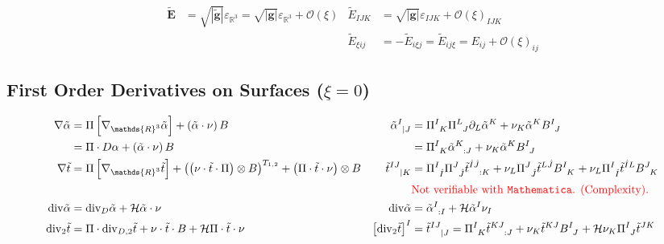 \documentclass[a4paper,7pt]{scrartcl}
\newcommand{\R}{\mathds{R}}
\newcommand{\mean}{\mathcal{H}}
\renewcommand{\div}{\mathrm{div}}
\newcommand{\gb}{\mathbf{g}}
\newcommand{\Eb}{\mathbf{E}}
\newcommand{\pism}{\Pi}
\newcommand{\pis}[1]{\pism\left[ #1 \right]}
\newcommand{\pissf}[2]{\tensor{\pism}{^{#1}_{#2}}}
\newcommand{\bsf}[2]{\tensor{B}{^{#1}_{#2}}}
\newcommand{\landau}{\mathcal{O}}
\newcommand{\landauo}{\landau\left( \xi \right)}
\newcommand{\talpha}{\tilde{\alpha}}
\begin{document}
  \begin{align*}
    \tilde{\Eb} &= \sqrt{\left| \tilde{\gb} \right|}\varepsilon_{\R^{3}} = \sqrt{\left| \gb \right|}\varepsilon_{\R^{3}} + \landauo
          &\tilde{E}_{IJK} &= \sqrt{\left| \gb \right|}\varepsilon_{IJK} + \landauo_{IJK}\\
         &&\tilde{E}_{\xi i j} &= -\tilde{E}_{i \xi j} = \tilde{E}_{i j \xi} = E_{ij} + \landauo_{ij}
  \end{align*}

  \subsection{First Order Derivatives on Surfaces (\( \xi = 0 \))}
  \begin{align*}
    \nabla\tilde{\alpha} &= \pis{\nabla_{\R^{3}}\tilde{\alpha}} + \left( \tilde{\alpha}\cdot\nu \right) B
          &\tensor{\tilde{\alpha}}{^{I}_{|J}} &= \pissf{I}{K}\pissf{L}{J}\partial_{L}\tilde{\alpha}^{K} + \nu_{K}\tilde{\alpha}^{K}\bsf{I}{J} \\
           &= \pism\cdot D\alpha + \left( \tilde{\alpha}\cdot\nu \right) B
                                              &&= \pissf{I}{K}\tensor{\tilde{\alpha}}{^{K}_{:J}} + \nu_{K}\tilde{\alpha}^{K}\bsf{I}{J}\\
    \nabla\tilde{t} &= \pis{\nabla_{\R^{3}}\tilde{t}} + \left( \left( \nu\cdot\tilde{t}\cdot\pism \right)\otimes B \right)^{T_{1,2}} 
                                                     + \left( \pism\cdot\tilde{t}\cdot\nu \right)\otimes B
          &\tensor{\tilde{t}}{^{IJ}_{|K}} &= \pissf{I}{\hat{I}}\pissf{J}{\hat{J}}\tensor{\tilde{t}}{^{\hat{I}\hat{J}}_{:K}}
                                            + \nu_{L}\pissf{J}{\hat{J}}\tilde{t}^{L\hat{J}}\bsf{I}{K} + \nu_{L}\pissf{I}{\hat{I}}\tilde{t}^{\hat{I}L}\bsf{J}{K}\\
                        &&&{\color{red}\text{Not verifiable with \texttt{Mathematica}. (Complexity)}.}\\
   \div\talpha &= \div_{D}\talpha + \mean \talpha\cdot\nu
          & \div\talpha &= \tensor{\talpha}{^{I}_{:I}} + \mean \talpha^{I}\nu_{I}\\
   \div_{2}\tilde{t} &= \pism\cdot\div_{D,2}\tilde{t} + \nu\cdot\tilde{t}\cdot B + \mean \pism\cdot\tilde{t}\cdot\nu
          & \left[ \div_{2}\tilde{t} \right]^{I} 
              &= \tensor{\tilde{t}}{^{IJ}_{|J}}
               = \pissf{I}{K}\tensor{\tilde{t}}{^{KJ}_{:J}} +\nu_{K}\tilde{t}^{KJ}\bsf{I}{J} + \mean \nu_{K}\pissf{I}{J}\tilde{t}^{JK} \\

\end{align*}
\end{document}
